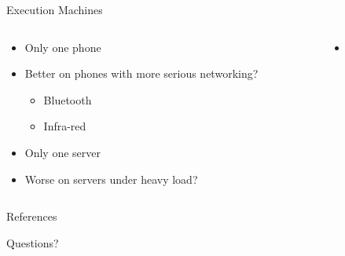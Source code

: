 \documentclass{beamer}
\begin{document}
\begin{frame}{Execution Machines}
\begin{columns}
\begin{column}{5cm}
\begin{itemize}
	\item Only one phone
	\item Better on phones with more serious networking?
	\begin{itemize}
		\item Bluetooth
		\item Infra-red
	\end{itemize}
	\item Only one server
	\item Worse on servers under heavy load?
\end{itemize}
\end{column}
\begin{column}{5cm}
\begin{itemize}
	\begin{itemize}
		\item {}
	\end{itemize}
\end{itemize}
\end{column}
\end{columns}
\end{frame}

\begin{frame}[allowframebreaks]{References}


\end{frame}

\begin{frame}{Questions?}
\end{frame}
\end{document}
